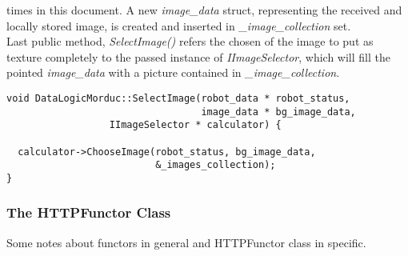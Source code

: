 times in this document. A new \textit{image\_data} struct, representing
the received and locally stored image, is created and inserted in
\textit{\_image\_collection} set.
\\
Last public method, \textit{SelectImage()} refers the chosen of the image
to put as texture completely to the passed instance of
\textit{IImageSelector}, which will fill the pointed \textit{image\_data}
with a picture contained in \textit{\_image\_collection}.
\\
\begin{lstlisting}[caption={\texttt{DataLogicMorduc::SelectImage()} method},
    label={code:datalogicmorduc:selectimage}]
void DataLogicMorduc::SelectImage(robot_data * robot_status,
                                  image_data * bg_image_data,
				  IImageSelector * calculator) {

  calculator->ChooseImage(robot_status, bg_image_data,
                          &_images_collection);
}

\end{lstlisting}

\subsubsection{The HTTPFunctor Class}
\label{concr:idatalogic:datalogicmorduc:httpfunctor}

Some notes about functors in general and HTTPFunctor class
in specific.

